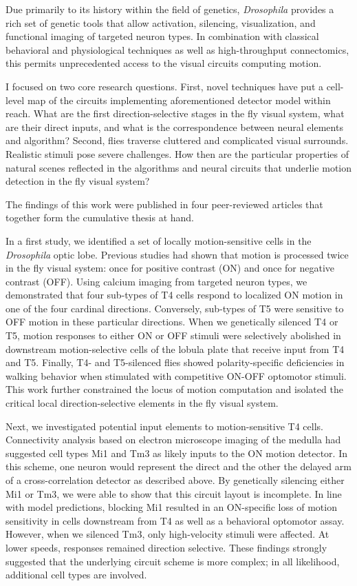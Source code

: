 Due primarily to its history within the field of genetics, \textit{Drosophila} provides a rich set of genetic tools that allow activation, silencing, visualization, and functional imaging of targeted neuron types. In combination with classical behavioral and physiological techniques as well as high-throughput connectomics, this permits unprecedented access to the visual circuits computing motion.

I focused on two core research questions. First, novel techniques have put a cell-level map of the circuits implementing aforementioned detector model within reach. What are the first direction-selective stages in the fly visual system, what are their direct inputs, and what is the correspondence between neural elements and algorithm? Second, flies traverse cluttered and complicated visual surrounds. Realistic stimuli pose severe challenges. How then are the particular properties of natural scenes reflected in the algorithms and neural circuits that underlie motion detection in the fly visual system?

The findings of this work were published in four peer-reviewed articles that together form the cumulative thesis at hand.

In a first study, we identified a set of locally motion-sensitive cells in the \textit{Drosophila} optic lobe. Previous studies had shown that motion is processed twice in the fly visual system: once for positive contrast (ON) and once for negative contrast (OFF). Using calcium imaging from targeted neuron types, we demonstrated that four sub-types of T4 cells respond to localized ON motion in one of the four cardinal directions. Conversely, sub-types of T5 were sensitive to OFF motion in these particular directions. When we genetically silenced T4 or T5, motion responses to either ON or OFF stimuli were selectively abolished in downstream motion-selective cells of the lobula plate that receive input from T4 and T5. Finally, T4- and T5-silenced flies showed polarity-specific deficiencies in walking behavior when stimulated with competitive ON-OFF optomotor stimuli. This work further constrained the locus of motion computation and isolated the critical local direction-selective elements in the fly visual system.

Next, we investigated potential input elements to motion-sensitive T4 cells. Connectivity analysis based on electron microscope imaging of the medulla had suggested cell types Mi1 and Tm3 as likely inputs to the ON motion detector. In this scheme, one neuron would represent the direct and the other the delayed arm of a cross-correlation detector as described above. By genetically silencing either Mi1 or Tm3, we were able to show that this circuit layout is incomplete. In line with model predictions, blocking Mi1 resulted in an ON-specific loss of motion sensitivity in cells downstream from T4 as well as a behavioral optomotor assay. However, when we silenced Tm3, only high-velocity stimuli were affected. At lower speeds, responses remained direction selective. These findings strongly suggested that the underlying circuit scheme is more complex; in all likelihood, additional cell types are involved.

